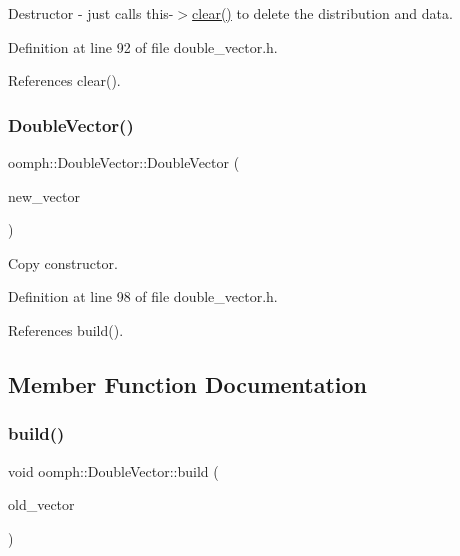 Destructor -\/ just calls this-\/$>$\hyperlink{classoomph_1_1DoubleVector_af1677445056759263b1b076966e7bfae}{clear()} to delete the distribution and data. 



Definition at line 92 of file double\+\_\+vector.\+h.



References clear().

\mbox{\label{classoomph_1_1DoubleVector_af547ee3b90c4a5598b655ed57ed78b2f}} 
\subsubsection{\texorpdfstring{Double\+Vector()}{DoubleVector()}\hspace{0.1cm}{\footnotesize\ttfamily [4/4]}}
{\footnotesize\ttfamily oomph\+::\+Double\+Vector\+::\+Double\+Vector (\begin{DoxyParamCaption}\item[{const \hyperlink{classoomph_1_1DoubleVector}{Double\+Vector} \&}]{new\+\_\+vector }\end{DoxyParamCaption})\hspace{0.3cm}{\ttfamily [inline]}}



Copy constructor. 



Definition at line 98 of file double\+\_\+vector.\+h.



References build().



\subsection{Member Function Documentation}
\mbox{\label{classoomph_1_1DoubleVector_a7bcc94c157d6853a0f0502e8a76ed380}} 
\subsubsection{\texorpdfstring{build()}{build()}\hspace{0.1cm}{\footnotesize\ttfamily [1/5]}}
{\footnotesize\ttfamily void oomph\+::\+Double\+Vector\+::build (\begin{DoxyParamCaption}\item[{const \hyperlink{classoomph_1_1DoubleVector}{Double\+Vector} \&}]{old\+\_\+vector }\end{DoxyParamCaption})}



